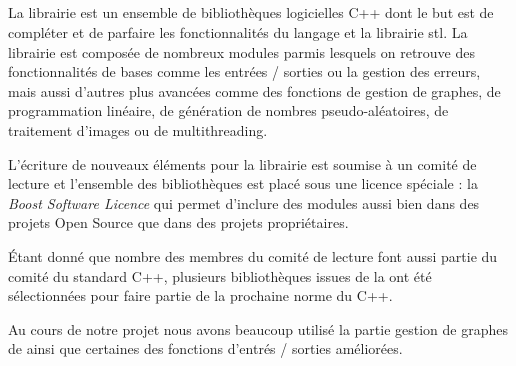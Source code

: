 
%


\subparagraph{}
La librairie \boost  est un ensemble de biblioth\`eques logicielles C++ dont le but est de compléter et de parfaire les fonctionnalités du langage et la librairie stl. La librairie \boost est compos\'ee de nombreux modules parmis lesquels on retrouve des fonctionnalit\'es de bases comme les entr\'ees / sorties ou la gestion des erreurs, mais aussi d'autres plus avanc\'ees comme des fonctions de gestion de graphes, de programmation lin\'eaire, de g\'en\'eration de nombres pseudo-al\'eatoires, de traitement d'images ou de multithreading.
\par
L'\'ecriture de nouveaux \'el\'ements pour la librairie \boost est soumise \`a un  comit\'e de lecture et l'ensemble des biblioth\`eques est plac\'e sous une licence sp\'eciale : la \textit{Boost Software Licence} qui permet d'inclure des modules \boost aussi bien dans des projets Open Source que dans des projets propri\'etaires.
\par
\'Etant donn\'e que nombre des membres du comit\'e de lecture font aussi partie du comit\'e du standard C++, plusieurs biblioth\`eques issues de la \boost ont \'et\'e s\'electionn\'ees pour faire partie de la prochaine norme du C++.
\par
Au cours de notre projet nous avons beaucoup utilis\'e la partie gestion de graphes de \boost ainsi que certaines des fonctions d'entr\'es / sorties am\'elior\'ees.
%
